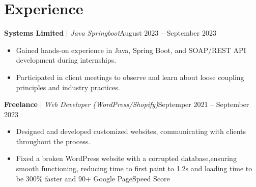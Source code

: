 
\section{Experience}
  \resumeSubHeadingListStart

          \resumeProjectHeading
          {\textbf{Systems Limited} $|$ \footnotesize\emph{Java Springboot}\vspace{8pt}}{August 2023 -- September 2023}
            \begin{itemize}
                \item 
                Gained hands-on experience in Java, Spring Boot, and SOAP/REST API development during internships.
                \item 
                Participated in client meetings to observe and learn about loose coupling principles and industry practices.
            \end{itemize}
          
          \resumeProjectHeading
          {\textbf{Freelance}\vspace{8pt} $|$ \footnotesize\emph{Web Developer (WordPress/Shopify)}}{Septemper 2021 -- September 2023}
            \begin{itemize}
              \item 
              Designed and developed customized websites, communicating with clients throughout the process.
              \item 
               Fixed a broken WordPress website with a corrupted database,ensuring smooth functioning, reducing time to first paint to 1.2s and loading time to be 300\% faster and 90+ Google PageSpeed Score
             
          \end{itemize}


    \resumeSubHeadingListEnd